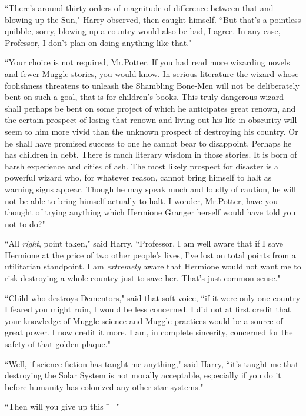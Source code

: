 ``There's around thirty orders of magnitude of difference between that and blowing up the Sun," Harry observed, then caught himself. ``But that's a pointless quibble, sorry, blowing up a country would also be bad, I agree. In any case, Professor, I don't plan on doing anything like that."

``Your choice is not required, Mr.\?Potter. If you had read more wizarding novels and fewer Muggle stories, you would know. In serious literature the wizard whose foolishness threatens to unleash the Shambling Bone-Men will not be deliberately bent on such a goal, that is for children's books. This truly dangerous wizard shall perhaps be bent on some project of which he anticipates great renown, and the certain prospect of losing that renown and living out his life in obscurity will seem to him more vivid than the unknown prospect of destroying his country. Or he shall have promised success to one he cannot bear to disappoint. Perhaps he has children in debt. There is much literary wisdom in those stories. It is born of harsh experience and cities of ash. The most likely prospect for disaster is a powerful wizard who, for whatever reason, cannot bring himself to halt as warning signs appear. Though he may speak much and loudly of caution, he will not be able to bring himself actually to halt. I wonder, Mr.\?Potter, have you thought of trying anything which Hermione Granger herself would have told you not to do?"

``All \emph{right}, point taken," said Harry. ``Professor, I am well aware that if I save Hermione at the price of two other people's lives, I've lost on total points from a utilitarian standpoint. I am \emph{extremely} aware that Hermione would not want me to risk destroying a whole country just to save her. That's just common sense."

``Child who destroys Dementors," said that soft voice, ``if it were only one country I feared you might ruin, I would be less concerned. I did not at first credit that your knowledge of Muggle science and Muggle practices would be a source of great power. I now credit it more. I am, in complete sincerity, concerned for the safety of that golden plaque."

``Well, if science fiction has taught me anything," said Harry, ``it's taught me that destroying the Solar System is not morally acceptable, especially if you do it before humanity has colonized any other star systems."

``Then will you give up this\==="

